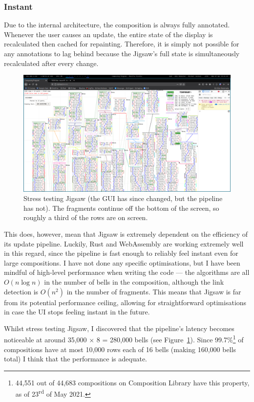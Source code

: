 \documentclass[12pt]{article}
\newcommand{\nth}[2]{#1\textsuperscript{#2}}
\begin{document}
\subsubsection{Instant}

Due to the internal architecture, the composition is always fully annotated.  Whenever the user
causes an update, the entire state of the display is recalculated then cached for repainting.
Therefore, it is simply not possible for any annotations to lag behind because the Jigsaw's full
state is simultaneously recalculated after every change.

\begin{figure}
    \centering
    \includegraphics[width=\textwidth]{stress-test}
    \caption{Stress testing Jigsaw (the GUI has since changed, but the pipeline has
    not).  The fragments continue off the bottom of the screen, so roughly a third of the rows are
    on screen.}\label{fig:stress-test}
\end{figure}

This does, however, mean that Jigsaw is extremely dependent on the efficiency of its update
pipeline.  Luckily, Rust and WebAssembly are working extremely well in this regard, since the
pipeline is fast enough to reliably feel instant even for large compositions.  I have not done any
specific optimisations, but I have been mindful of high-level performance when writing the code
--- the algorithms are all $O(n \log n)$ in the number of bells in the composition, although the
link detection is $O(n^2)$ in the number of fragments.  This means that Jigsaw is far from its
potential performance ceiling, allowing for straightforward optimisations in case the UI stops
feeling instant in the future.

Whilst stress testing Jigsaw, I discovered that the pipeline's latency becomes noticeable at around 35,000
$\times$ 8 = 280,000 bells (see Figure~\ref{fig:stress-test}).  Since 99.7\%\footnote{44,551 out of
44,683 compositions on Composition Library have this property, as of \nth{23}{rd} of May 2021.} of
compositions have at most 10,000 rows each of 16 bells (making 160,000 bells total) I think that the
performance is adequate.
\end{document}
